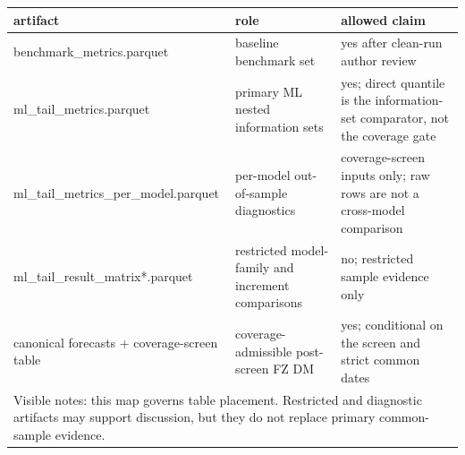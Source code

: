\begin{tabular}{lll}
\toprule
artifact & role & allowed claim \\
\midrule
benchmark\_metrics.parquet & baseline benchmark set & yes after clean-run author review \\
ml\_tail\_metrics.parquet & primary ML nested information sets & yes; direct quantile is the information-set comparator, not the coverage gate \\
ml\_tail\_metrics\_per\_model.parquet & per-model out-of-sample diagnostics & coverage-screen inputs only; raw rows are not a cross-model comparison \\
ml\_tail\_result\_matrix*.parquet & restricted model-family and increment comparisons & no; restricted sample evidence only \\
canonical forecasts + coverage-screen table & coverage-admissible post-screen FZ DM & yes; conditional on the screen and strict common dates \\
\midrule
\multicolumn{3}{l}{\footnotesize Visible notes: this map governs table placement. Restricted and diagnostic artifacts may support discussion, but they do not replace primary common-sample evidence.} \\
\bottomrule
\end{tabular}
